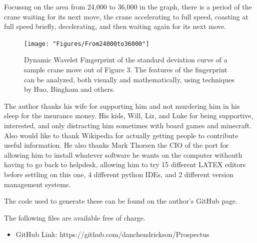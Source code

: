\documentclass[journal=jacsat,manuscript=article]{achemso}
\begin{document}
Focussng on the area from 24,000 to 36,000 in the graph, there is a period of the crane waiting for its next move, the crane accelerating to full speed, coasting at full speed briefly, decelerating, and then waiting again for its next move.  

\begin{figure}
	\centering
	\texttt{[image: "Figures/From24000to36000"]}
	\caption[Smoothed and StdDev]{Dynamic Wavelet Fingerprint of the standard deviation curve of a sample crane move out of Figure 3.  The features of the fingerprint can be analyzed, both visually and mathematically, using techniques by Huo, Bingham and others.}
	\label{fig:StdDevFingerprint}
\end{figure}


\pagebreak
\begin{acknowledgement}

The author thanks his wife for supporting him and not murdering him in his sleep for the insurance money.  His kids, Will, Liz, and Luke for being supportive, interested, and only distracting him sometimes with board games and minecraft.  Also would like to thank Wikipedia for actually getting people to contribute useful information.  He also thanks Mark Thorsen the CIO of the port for allowing him to install whatever software he wants on the computer withouth having to go back to helpdesk, allowing him to try 15 different LATEX editors before settling on this one, 4 different python IDEs, and 2 different version management systems.

\end{acknowledgement}

\begin{suppinfo}

The code used to generate these can be found on the author's GitHub page.

The following files are available free of charge.
\begin{itemize}
  \item GitHub Link: https://github.com/danchendrickson/Prospectus
\end{itemize}

\end{suppinfo}


	

\end{document}
